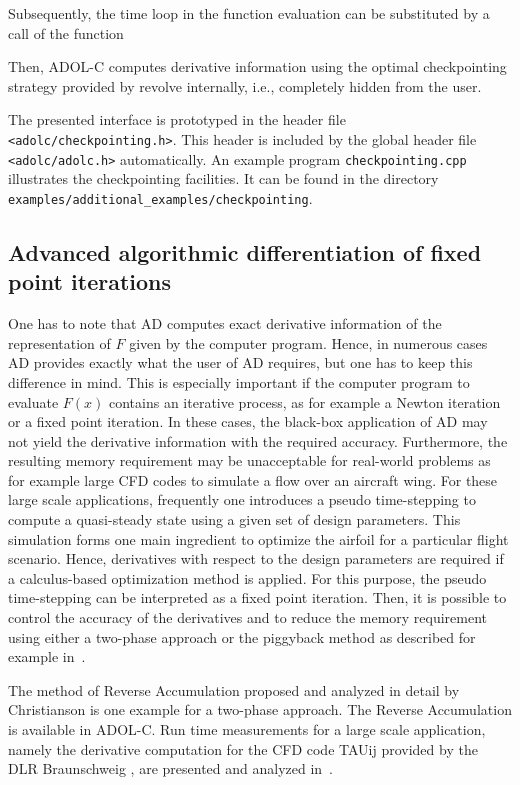 \documentclass[11pt,twoside]{article}
\begin{document}
Subsequently, the time loop in the function evaluation can be
substituted by a call of the function
\medskip

\noindent
\hspace*{2cm}{\sf int cpc.checkpointing(tapeId);}
\medskip

\noindent
Then, ADOL-C computes derivative information using the optimal checkpointing
strategy provided by {\sf revolve} internally, i.e., completely hidden from the user.

The presented interface is prototyped in the header file
\verb=<adolc/checkpointing.h>=. This header
is included by the global header file \verb=<adolc/adolc.h>= automatically. 
An example program \verb=checkpointing.cpp= illustrates the
checkpointing facilities. It can be found in the directory \verb=examples/additional_examples/checkpointing=.
%
%
%
\subsection{Advanced algorithmic differentiation of fixed point iterations}
%
One has to note that AD computes exact derivative information of the representation of
$F$ given by the computer program. Hence, in numerous cases AD provides exactly
what the user of AD requires, but one has to keep this difference in
mind. This is especially important if the computer program to evaluate $F(x)$
contains an iterative process, as for example a Newton iteration or a fixed
point iteration. In these cases, the black-box application of AD may not yield
the derivative information with the required accuracy. Furthermore, the
resulting memory requirement may be unacceptable for real-world problems as
for example large CFD codes to simulate a flow over an aircraft wing. For these
large scale applications, frequently one introduces a pseudo time-stepping to compute
a quasi-steady state using a given set of design parameters.
This simulation forms one main ingredient to optimize the airfoil for a
particular flight scenario. Hence, derivatives with respect
to the design parameters are required if a calculus-based
optimization method is applied. For this purpose, the pseudo time-stepping can be
interpreted as a fixed point iteration. Then, it is possible
to control the accuracy of the derivatives and to reduce the memory
requirement using either a two-phase approach or the
piggyback method as described for example in~\cite[Section~11.4]{GrWa08}.

The method of Reverse Accumulation proposed and analyzed in detail by
Christianson \cite{Chr94} is one example for a two-phase approach.
The Reverse Accumulation is available in ADOL-C. Run time measurements for a large
scale application, namely the derivative computation for the CFD code TAUij
provided by the DLR Braunschweig \cite{Hei06}, are
presented and analyzed in~\cite{SWGH08}.
\end{document}
